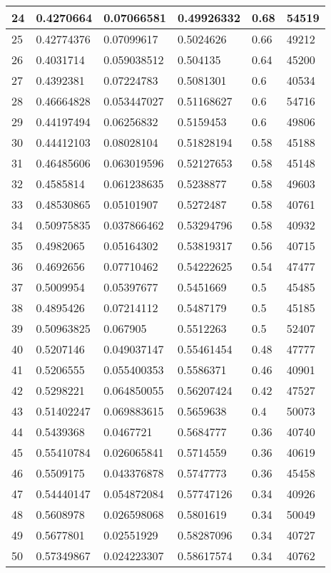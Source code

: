 \begin{longtable}{|l|l|l|l|l|l|}
24 & 0.4270664 & 0.07066581 & 0.49926332 & 0.68 & 54519 \\ \hline 
25 & 0.42774376 & 0.07099617 & 0.5024626 & 0.66 & 49212 \\ \hline 
26 & 0.4031714 & 0.059038512 & 0.504135 & 0.64 & 45200 \\ \hline 
27 & 0.4392381 & 0.07224783 & 0.5081301 & 0.6 & 40534 \\ \hline 
28 & 0.46664828 & 0.053447027 & 0.51168627 & 0.6 & 54716 \\ \hline 
29 & 0.44197494 & 0.06256832 & 0.5159453 & 0.6 & 49806 \\ \hline 
30 & 0.44412103 & 0.08028104 & 0.51828194 & 0.58 & 45188 \\ \hline 
31 & 0.46485606 & 0.063019596 & 0.52127653 & 0.58 & 45148 \\ \hline 
32 & 0.4585814 & 0.061238635 & 0.5238877 & 0.58 & 49603 \\ \hline 
33 & 0.48530865 & 0.05101907 & 0.5272487 & 0.58 & 40761 \\ \hline 
34 & 0.50975835 & 0.037866462 & 0.53294796 & 0.58 & 40932 \\ \hline 
35 & 0.4982065 & 0.05164302 & 0.53819317 & 0.56 & 40715 \\ \hline 
36 & 0.4692656 & 0.07710462 & 0.54222625 & 0.54 & 47477 \\ \hline 
37 & 0.5009954 & 0.05397677 & 0.5451669 & 0.5 & 45485 \\ \hline 
38 & 0.4895426 & 0.07214112 & 0.5487179 & 0.5 & 45185 \\ \hline 
39 & 0.50963825 & 0.067905 & 0.5512263 & 0.5 & 52407 \\ \hline 
40 & 0.5207146 & 0.049037147 & 0.55461454 & 0.48 & 47777 \\ \hline 
41 & 0.5206555 & 0.055400353 & 0.5586371 & 0.46 & 40901 \\ \hline 
42 & 0.5298221 & 0.064850055 & 0.56207424 & 0.42 & 47527 \\ \hline 
43 & 0.51402247 & 0.069883615 & 0.5659638 & 0.4 & 50073 \\ \hline 
44 & 0.5439368 & 0.0467721 & 0.5684777 & 0.36 & 40740 \\ \hline 
45 & 0.55410784 & 0.026065841 & 0.5714559 & 0.36 & 40619 \\ \hline 
46 & 0.5509175 & 0.043376878 & 0.5747773 & 0.36 & 45458 \\ \hline 
47 & 0.54440147 & 0.054872084 & 0.57747126 & 0.34 & 40926 \\ \hline 
48 & 0.5608978 & 0.026598068 & 0.5801619 & 0.34 & 50049 \\ \hline 
49 & 0.5677801 & 0.02551929 & 0.58287096 & 0.34 & 40727 \\ \hline 
50 & 0.57349867 & 0.024223307 & 0.58617574 & 0.34 & 40762 \\ \hline 
\end{longtable}